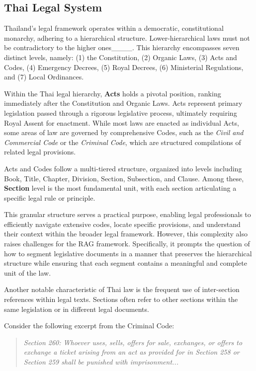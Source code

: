 \subsection{Thai Legal System}
\label{subsec: thai_legal}

Thailand's legal framework operates within a democratic, constitutional monarchy, adhering to a hierarchical structure. 
%
Lower-hierarchical laws must not be contradictory to the higher ones____. 
%
This hierarchy encompasses seven distinct levels, namely: (1) the Constitution, (2) Organic Laws, (3) Acts and Codes, (4) Emergency Decrees, (5) Royal Decrees, (6) Ministerial Regulations, and (7) Local Ordinances.

Within the Thai legal hierarchy, \textbf{Acts} holds a pivotal position, ranking immediately after the Constitution and Organic Laws. 
%
Acts represent primary legislation passed through a rigorous legislative process, ultimately requiring Royal Assent for enactment. 
%
While most laws are enacted as individual Acts, some areas of law are governed by comprehensive Codes, such as the \textit{Civil and Commercial Code} or the \textit{Criminal Code}, which are structured compilations of related legal provisions.

Acts and Codes follow a multi-tiered structure, organized into levels including Book, Title, Chapter, Division, Section, Subsection, and Clause. 
%
Among these, \textbf{Section} level is the most fundamental unit, with each section articulating a specific legal rule or principle.

This granular structure serves a practical purpose, enabling legal professionals to efficiently navigate extensive codes, locate specific provisions, and understand their context within the broader legal framework. 
%
However, this complexity also raises challenges for the RAG framework. 
%
Specifically, it prompts the question of how to segment legislative documents in a manner that preserves the hierarchical structure while ensuring that each segment contains a meaningful and complete unit of the law.

Another notable characteristic of Thai law is the frequent use of inter-section references within legal texts. 
%
Sections often refer to other sections within the same legislation or in different legal documents.

Consider the following excerpt from the Criminal Code:
\begin{quote}
    \textit{Section 260: Whoever uses, sells, offers for sale, exchanges, or offers to exchange a ticket arising from an act as provided for in Section 258 or Section 259 shall be punished with imprisonment...}%
    \label{quote: inter_ref}
\end{quote}

